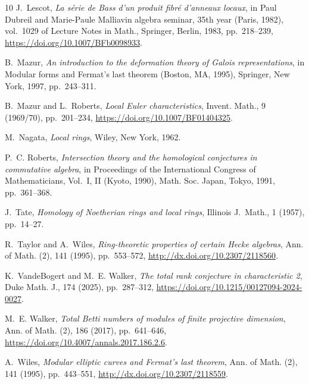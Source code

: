 \documentclass[twoside,leqno]{article}
\begin{document}
\begin{thebibliography}{10}
{\sc J.~Lescot}, {\em La s\'erie de {B}ass d'un produit fibr\'e{} d'anneaux
  locaux}, in Paul {D}ubreil and {M}arie-{P}aule {M}alliavin algebra seminar,
  35th year ({P}aris, 1982), vol.~1029 of Lecture Notes in Math., Springer,
  Berlin, 1983, pp.~218--239, 
  \url{https://doi.org/10.1007/BFb0098933}.

{\sc B.~Mazur}, {\em An introduction to the deformation theory of {G}alois
  representations}, in Modular forms and {F}ermat's last theorem ({B}oston,
  {MA}, 1995), Springer, New York, 1997, pp.~243--311.

{\sc B.~Mazur and L.~Roberts}, {\em Local {E}uler characteristics}, Invent.
  Math., 9 (1969/70), pp.~201--234, 
  \url{https://doi.org/10.1007/BF01404325}.

{\sc M.~Nagata}, {\em {Local rings}}, Wiley, New York, 1962.

{\sc P.~C. Roberts}, {\em Intersection theory and the homological conjectures
  in commutative algebra}, in Proceedings of the {I}nternational {C}ongress of
  {M}athematicians, {V}ol.\ {I}, {II} ({K}yoto, 1990), Math. Soc. Japan, Tokyo,
  1991, pp.~361--368.

{\sc J.~Tate}, {\em {Homology of Noetherian rings and local rings}}, Illinois
  J.\ Math., 1 (1957), pp.~14--27.

{\sc R.~Taylor and A.~Wiles}, {\em Ring-theoretic properties of certain {H}ecke
  algebras}, Ann. of Math. (2), 141 (1995), pp.~553--572,
  \url{http://dx.doi.org/10.2307/2118560}.

{\sc K.~VandeBogert and M.~E. Walker}, {\em The total rank conjecture in
  characteristic 2}, Duke Math. J., 174 (2025), pp.~287--312,
  \url{https://doi.org/10.1215/00127094-2024-0027}.

{\sc M.~E. Walker}, {\em Total {B}etti numbers of modules of finite projective
  dimension}, Ann. of Math. (2), 186 (2017), pp.~641--646,
  \url{https://doi.org/10.4007/annals.2017.186.2.6}.

{\sc A.~Wiles}, {\em Modular elliptic curves and {F}ermat's last theorem}, Ann.
  of Math. (2), 141 (1995), pp.~443--551,
  \url{http://dx.doi.org/10.2307/2118559}.

\end{thebibliography}
\end{document}
